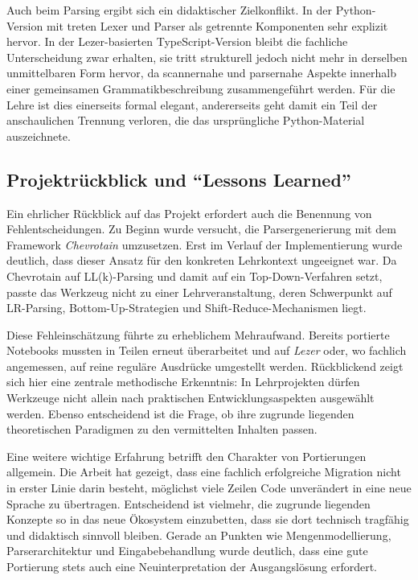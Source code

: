 Auch beim Parsing ergibt sich ein didaktischer Zielkonflikt. In der Python-Version mit \emph{} treten Lexer und Parser als getrennte Komponenten sehr explizit hervor. In der Lezer-basierten TypeScript-Version bleibt die fachliche Unterscheidung zwar erhalten, sie tritt strukturell jedoch nicht mehr in derselben unmittelbaren Form hervor, da scannernahe und parsernahe Aspekte innerhalb einer gemeinsamen Grammatikbeschreibung zusammengeführt werden. Für die Lehre ist dies einerseits formal elegant, andererseits geht damit ein Teil der anschaulichen Trennung verloren, die das ursprüngliche Python-Material auszeichnete.

\subsection{Projektrückblick und \enquote{Lessons Learned}}

Ein ehrlicher Rückblick auf das Projekt erfordert auch die Benennung von Fehlentscheidungen. Zu Beginn wurde versucht, die Parsergenerierung mit dem Framework \emph{Chevrotain} umzusetzen. Erst im Verlauf der Implementierung wurde deutlich, dass dieser Ansatz für den konkreten Lehrkontext ungeeignet war. Da Chevrotain auf LL(k)-Parsing und damit auf ein Top-Down-Verfahren setzt, passte das Werkzeug nicht zu einer Lehrveranstaltung, deren Schwerpunkt auf LR-Parsing, Bottom-Up-Strategien und Shift-Reduce-Mechanismen liegt.

Diese Fehleinschätzung führte zu erheblichem Mehraufwand. Bereits portierte Notebooks mussten in Teilen erneut überarbeitet und auf \emph{Lezer} oder, wo fachlich angemessen, auf reine reguläre Ausdrücke umgestellt werden. Rückblickend zeigt sich hier eine zentrale methodische Erkenntnis: In Lehrprojekten dürfen Werkzeuge nicht allein nach praktischen Entwicklungsaspekten ausgewählt werden. Ebenso entscheidend ist die Frage, ob ihre zugrunde liegenden theoretischen Paradigmen zu den vermittelten Inhalten passen.

Eine weitere wichtige Erfahrung betrifft den Charakter von Portierungen allgemein. Die Arbeit hat gezeigt, dass eine fachlich erfolgreiche Migration nicht in erster Linie darin besteht, möglichst viele Zeilen Code unverändert in eine neue Sprache zu übertragen. Entscheidend ist vielmehr, die zugrunde liegenden Konzepte so in das neue Ökosystem einzubetten, dass sie dort technisch tragfähig und didaktisch sinnvoll bleiben. Gerade an Punkten wie Mengenmodellierung, Parserarchitektur und Eingabebehandlung wurde deutlich, dass eine gute Portierung stets auch eine Neuinterpretation der Ausgangslösung erfordert.

